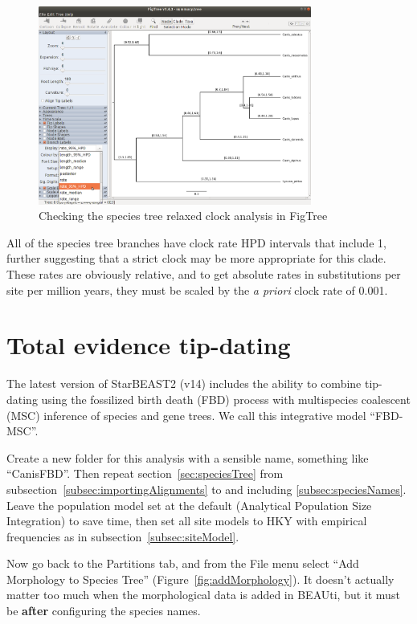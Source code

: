 \documentclass[12pt]{article}
\begin{document}
\begin{figure}[htb!]
\centering
\includegraphics[width=0.8\textwidth]{figures/figtreeUCLN.png}
\caption
{Checking the species tree relaxed clock analysis in FigTree}
\label{fig:figtreeUCLN}
\end{figure}

All of the species tree branches have clock rate HPD intervals
that include 1, further suggesting that a strict clock may be more
appropriate for this clade. These rates are obviously relative, and
to get absolute rates in substitutions per site per million years,
they must be scaled by the \textit{a priori} clock rate of 0.001.

\section{Total evidence tip-dating}
\label{sec:FBD}

The latest version of StarBEAST2 (v14) includes the ability to combine
tip-dating using the fossilized birth death (FBD) process with multispecies
coalescent (MSC) inference of species and gene trees. We call this
integrative model ``FBD-MSC''.

Create a new folder for this analysis with a sensible name, something like
``CanisFBD''. Then repeat section~\ref{sec:speciesTree} from
subsection~\ref{subsec:importingAlignments} to and including
\ref{subsec:speciesNames}. Leave the population model set at the default
(Analytical Population Size Integration) to save time, then set all site
models to HKY with empirical frequencies as in
subsection~\ref{subsec:siteModel}.

Now go back to the Partitions tab, and from the File menu select
``Add Morphology to Species Tree'' (Figure~\ref{fig:addMorphology}).
It doesn't actually matter too much when the morphological data is added
in BEAUti, but it must be \textbf{after} configuring the species names.
\end{document}
